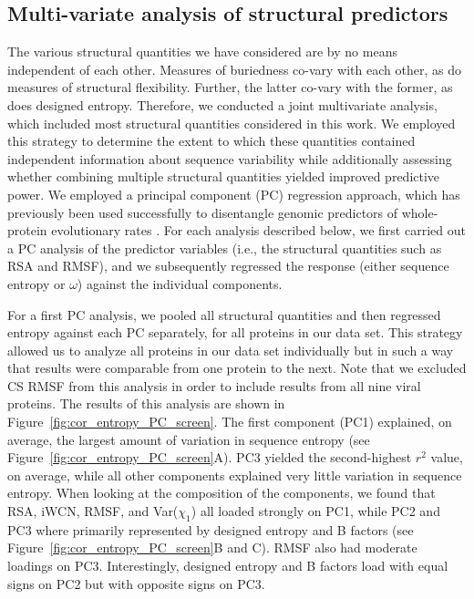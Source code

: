 \documentclass[smallextended]{svjour3}
\begin{document}
 
\subsection*{Multi-variate analysis of structural predictors}

The various structural quantities we have considered are by no means independent of each other. Measures of buriedness co-vary with each other, as do measures of structural flexibility. Further, the latter co-vary with the former, as does designed entropy. Therefore, we conducted a joint multivariate analysis, which included most structural quantities considered in this work. We employed this strategy to determine the extent to which these quantities contained independent information about sequence variability while additionally
assessing whether combining multiple structural quantities yielded improved predictive power. We employed a principal component (PC) regression approach, which has previously been used successfully to disentangle genomic predictors of whole-protein evolutionary rates \citep{Drummondetal2006,Bloometal2006}. For each analysis described below, we first carried out a PC analysis of the predictor variables (i.e., the structural quantities such as RSA and RMSF), and we subsequently regressed the response (either sequence entropy or $\omega$) against the individual components.

For a first PC analysis, we pooled all structural quantities and then regressed entropy against each PC separately, for all proteins in our data set. This strategy allowed us to analyze all proteins in our data set individually but in such a way that results were comparable from one protein to the next. Note that we excluded CS RMSF from this analysis in order to include results from all nine viral proteins. The results of this analysis are shown in Figure~\ref{fig:cor_entropy_PC_screen}. The first component (PC1) explained, on average, the largest amount of variation in sequence entropy (see Figure~\ref{fig:cor_entropy_PC_screen}A). PC3 yielded the second-highest $r^2$ value, on average, while all other components explained very little variation in sequence entropy. When looking at the composition of the components, we found that RSA, iWCN, RMSF, and Var($\chi_1$) all loaded strongly on PC1, while PC2 and PC3 where primarily represented by designed entropy and B factors (see Figure~\ref{fig:cor_entropy_PC_screen}B and C). RMSF also had moderate loadings on PC3. Interestingly, designed entropy and B factors load with equal signs on PC2 but with opposite signs on PC3.
\end{document}
